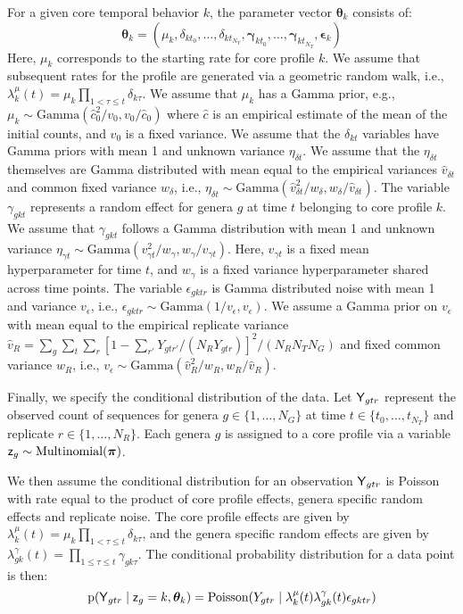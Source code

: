 For a given core temporal behavior $k$, the parameter vector $\bm{\theta}_{k}$ consists of:
\[ \bm{\theta}_{k} = (\mu_{k},\delta_{kt_{0}},\ldots,\delta_{kt_{N_T}},\bm{\gamma}_{kt_{0}},\ldots,\bm{\gamma}_{kt_{N_T}},\bm{\epsilon}_{k})
\]
Here, $\mu_{k}$ corresponds to the starting rate for core profile $k$.  We assume that subsequent rates for the profile are generated via a geometric random walk, i.e., $\lambda^{\mu}_{k}(t) = \mu_{k} \prod_{1 < \tau \leq t} \delta_{k\tau}$.  We assume that $\mu_{k}$ has a Gamma prior, e.g., $\mu_{k} \sim \textrm{Gamma}(\widehat{c}^{2}_{0}/v_{0},v_{0}/\widehat{c}_{0})$ where $\widehat{c}$ is an empirical estimate of the mean of the initial counts, and $v_{0}$ is a fixed variance.  We assume that the $\delta_{k t}$ variables have Gamma priors with mean 1 and unknown variance $\eta_{\delta t}$.  We assume that the $\eta_{\delta t}$ themselves are Gamma distributed with mean equal to the empirical variances $\widehat{v}_{\delta t}$ and common fixed variance $w_{\delta}$, i.e., $\eta_{\delta t} \sim \textrm{Gamma}(\widehat{v}_{\delta t}^{2}/w_{\delta},w_{\delta}/\widehat{v}_{\delta t})$.  The variable $\gamma_{gkt}$ represents a random effect for genera $g$ at time $t$ belonging to core profile $k$.  We assume that $\gamma_{gkt}$ follows a Gamma distribution with mean 1 and unknown variance $\eta_{\gamma t} \sim \textrm{Gamma}(v^{2}_{\gamma t}/w_{\gamma},w_{\gamma}/v_{\gamma t})$.  Here, $v_{\gamma t}$ is a fixed mean hyperparameter for time $t$, and $w_{\gamma}$ is a fixed variance hyperparameter shared across time points.  The variable $\epsilon_{gktr}$ is Gamma distributed noise with mean 1 and variance $v_{\epsilon}$, i.e., $\epsilon_{gktr} \sim \textrm{Gamma}(1/v_{\epsilon},v_{\epsilon})$.  We assume a Gamma prior on $v_{\epsilon}$ with mean equal to the empirical replicate variance $\widehat{v}_R = \sum_{g} \sum_{t} \sum_{r} [1-\sum_{r'} Y_{gtr'}/(N_{R} Y_{gtr})]^{2}/(N_{R} N_{T} N_{G})$ and fixed common variance $w_R$, i.e., $v_{\epsilon} \sim \textrm{Gamma}(\widehat{v}_{R}^{2}/w_{R},w_{R}/\widehat{v}_R)$. 

Finally, we specify the conditional distribution of the data.  Let $\mbox{\textsf{Y}}_{gtr}$ represent the observed count of sequences for genera $g \in \{1,\ldots, N_G\}$ at time $t \in \{t_0,\ldots, t_{N_T}\}$ and replicate $r \in \{1,\ldots, N_R \}$.  Each genera $g$ is assigned to a core profile via a variable $\mbox{\textsf{z}}_g \sim \textrm{Multinomial}(\bm{\pi})$.  

We then assume the conditional distribution for an observation $\mbox{\textsf{Y}}_{gtr}$ is Poisson with rate equal to the product of core profile effects, genera specific random effects and replicate noise.  The core profile effects are given by $\lambda^{\mu}_{k}(t) = \mu_{k} \prod_{1 < \tau \leq t} \delta_{k\tau}$, and the genera specific random effects are given by $\lambda^{\gamma}_{gk}(t) = \prod_{1 \leq \tau \leq t} \gamma_{gk\tau}$.  The conditional probability distribution for a data point is then:
\[
\textrm{p}(\mbox{\textsf{Y}}_{gtr} \; | \; \mbox{\textsf{z}}_g = k,\bm{\theta}_{k}) = \textrm{Poisson}(Y_{gtr} \; | \; \lambda^{\mu}_{k}(t) \lambda^{\gamma}_{gk}(t) \epsilon_{gktr}) 
\]

